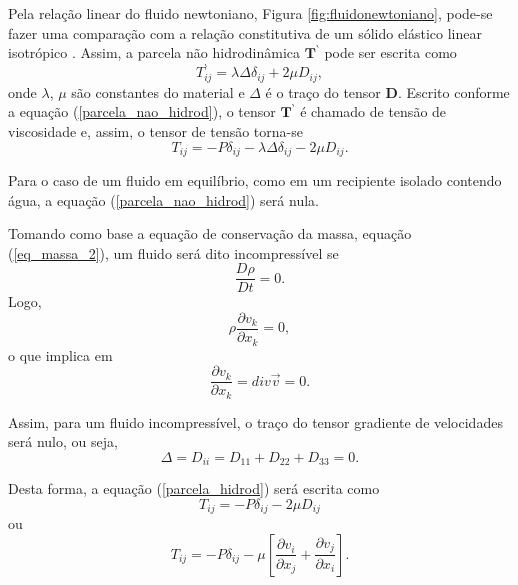 Pela relação linear do fluido newtoniano, Figura \ref{fig:fluidonewtoniano}, pode-se fazer uma comparação com a relação constitutiva de um sólido elástico linear isotrópico \cite{Lai}. Assim, a parcela não hidrodinâmica $ \textbf{T} ^{ \backprime} $ pode ser escrita como
\begin{equation} \label{parcela_nao_hidrod}
T_{ij} ^{\backprime} = \lambda \Delta \delta _{ij} + 2 \mu D_{ij},
\end{equation}
onde $ \lambda $, $  \mu $ são constantes do material e $ \Delta $ é o traço do tensor \textbf{D}. Escrito conforme a equação (\ref{parcela_nao_hidrod}), o tensor $ \textbf{T} ^{ \backprime}$ é chamado de tensão de viscosidade e, assim, o tensor de tensão torna-se
\begin{equation} \label{parcela_hidrod}
T_{ij} = - P \delta _{ij} - \lambda \Delta \delta _{ij} - 2 \mu D_{ij}.
\end{equation}

Para o caso de um fluido em equilíbrio, como em um recipiente isolado contendo água, a equação (\ref{parcela_nao_hidrod}) será nula.

Tomando como base a equação de conservação da massa, equação (\ref{eq_massa_2}), um fluido será dito incompressível se
\begin{equation}
\dfrac{ D \rho}{Dt} = 0.
\end{equation} 
Logo,
\begin{equation}
\rho \dfrac{ \partial v_{k}}{ \partial x_{k}} = 0,
\end{equation} 
o que implica em
\begin{equation}
\dfrac{ \partial v_{k}}{ \partial x_{k}} = div \vec{v} = 0.
\end{equation}

Assim, para um fluido incompressível, o traço do tensor gradiente de velocidades será nulo, ou seja,
\begin{equation}
\Delta = D_{ii} = D_{11} + D_{22} + D_{33} = 0. 
\end{equation}

Desta forma, a equação (\ref{parcela_hidrod}) será escrita como
\begin{equation}
T_{ij} = - P \delta _{ij} - 2 \mu D_{ij}
\end{equation}
ou
\begin{equation} \label{parcela_hidrod_2}
T_{ij} = - P \delta _{ij} - \mu \left[ \dfrac{ \partial v_{i}}{ \partial x_{j}} + \dfrac{ \partial v_{j}}{ \partial x_{i}} \right].
\end{equation}

